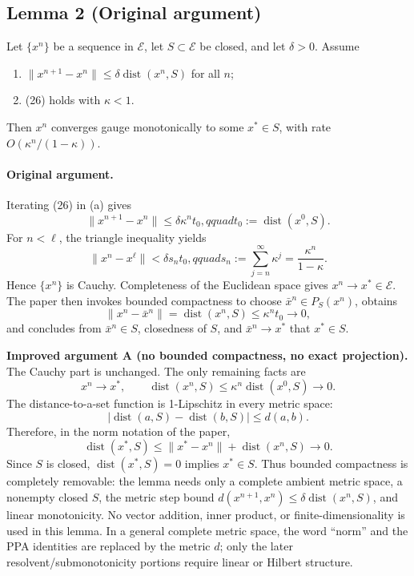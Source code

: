 \documentclass[11pt]{article}
\newenvironment{improved}{\par\begingroup\color{red}}{\par\endgroup}
\newcommand{\E}{\mathcal E}
\newcommand{\dist}{\operatorname{dist}}
\begin{document}
\subsection*{Lemma 2 (Original argument)}

Let \(\{x^n\}\) be a sequence in \(\E\), let \(S\subset\E\) be closed, and let \(\delta>0\). Assume
\begin{enumerate}[label=(\alph*)]
\item \(\|x^{n+1}-x^n\|\le\delta\dist(x^n,S)\) for all \(n\);
\item (26) holds with \(\kappa<1\).
\end{enumerate}
Then \(x^n\) converges gauge monotonically to some \(x^*\in S\), with rate \(O(\kappa^n/(1-\kappa))\).

\paragraph{Original argument.} Iterating (26) in (a) gives
\[
\|x^{n+1}-x^n\|\le \delta\kappa^n t_0,qquad t_0:=\dist(x^0,S).
\]
For \(n<\ell\), the triangle inequality yields
\[
\|x^n-x^\ell\|<\delta s_n t_0,qquad
s_n:=\sum_{j=n}^{\infty}\kappa^j=\frac{\kappa^n}{1-\kappa}.
\]
Hence \(\{x^n\}\) is Cauchy. Completeness of the Euclidean space gives \(x^n\to x^*\in\E\). The paper then invokes bounded compactness to choose \(\bar x^n\in P_S(x^n)\), obtains
\[
\|x^n-\bar x^n\|=\dist(x^n,S)\le\kappa^n t_0\to0,
\]
and concludes from \(\bar x^n\in S\), closedness of \(S\), and \(\bar x^n\to x^*\) that \(x^*\in S\).

\begin{improved}
\textbf{Improved argument A (no bounded compactness, no exact projection).} The Cauchy part is unchanged. The only remaining facts are
\[
 x^n\to x^*,
 \qquad \dist(x^n,S)\le \kappa^n\dist(x^0,S)\longrightarrow0.
\]
The distance-to-a-set function is 1-Lipschitz in every metric space:
\[
 \bigl|\dist(a,S)-\dist(b,S)\bigr|\le d(a,b).
\]
Therefore, in the norm notation of the paper,
\[
 \dist(x^*,S)\le \|x^*-x^n\|+\dist(x^n,S)\longrightarrow0.
\]
Since \(S\) is closed, \(\dist(x^*,S)=0\) implies \(x^*\in S\). Thus bounded compactness is completely removable: the lemma needs only a complete ambient metric space, a nonempty closed \(S\), the metric step bound \(d(x^{n+1},x^n)\le\delta\dist(x^n,S)\), and linear monotonicity. No vector addition, inner product, or finite-dimensionality is used in this lemma. In a general complete metric space, the word ``norm'' and the PPA identities are replaced by the metric \(d\); only the later resolvent/submonotonicity portions require linear or Hilbert structure.
\end{improved}
\end{document}

